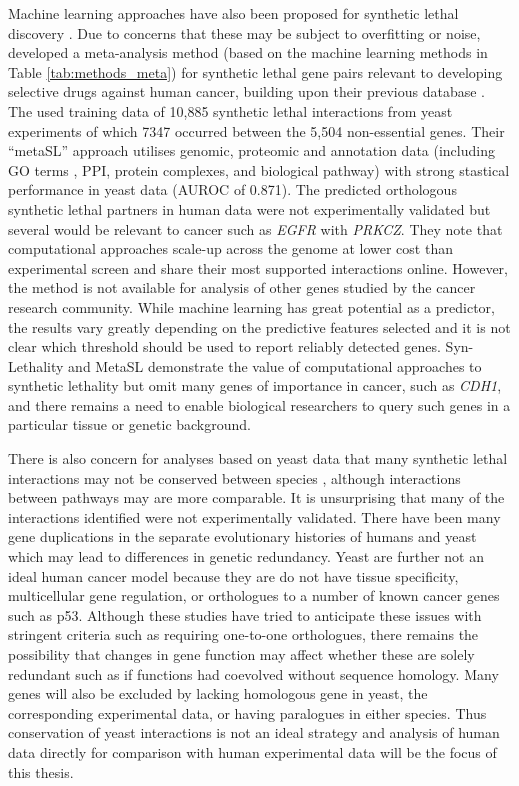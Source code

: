 Machine learning approaches have also been proposed for synthetic lethal discovery \citep{Babyak2004, Lee2009}. Due to concerns that these may be subject to overfitting or noise, \citet{Wu2014} developed a meta-analysis method (based on the machine learning methods in Table \ref{tab:methods_meta}) for synthetic lethal gene pairs relevant to developing selective drugs against human cancer, building upon their previous database \citep{Li2014}. The used training data of 10,885 synthetic lethal interactions from yeast experiments of which 7347 occurred between the 5,504 non-essential genes. Their ``metaSL'' approach utilises genomic, proteomic and annotation data (including GO terms \cite{Ashburner2000}, PPI, protein complexes, and biological pathway) with strong stastical performance in yeast data (AUROC of 0.871). The predicted orthologous synthetic lethal partners in human data were not experimentally validated but several would be relevant to cancer such as \textit{EGFR} with \textit{PRKCZ}. They note that computational approaches scale-up across the genome at lower cost than experimental screen and share their most supported interactions online. However, the method is not available for analysis of other genes studied by the cancer research community. While machine learning has great potential as a predictor, the results vary greatly depending on the predictive features selected and it is not clear which threshold should be used to report reliably detected genes. Syn-Lethality \citep{Li2014} and MetaSL \citep{Wu2014} demonstrate the value of computational approaches to synthetic lethality but omit many genes of importance in cancer, such as \textit{CDH1}, and there remains a need to enable biological researchers to query such genes in a particular tissue or genetic background. 

There is also concern for analyses based on yeast data that many synthetic lethal interactions may not be conserved between species \citet{Dixon2009a}, although interactions between pathways may are more comparable. It is unsurprising that many of the interactions identified were not experimentally validated. There have been many gene duplications in the separate evolutionary histories of humans and yeast which may lead to differences in genetic redundancy. Yeast are further not an ideal human cancer model because they are do not have tissue specificity, multicellular gene regulation, or orthologues to a number of known cancer genes such as p53. Although these studies have tried to anticipate these issues with stringent criteria such as requiring one-to-one orthologues, there remains the possibility that changes in gene function may affect whether these are solely redundant such as if functions had coevolved without sequence homology. Many genes will also be excluded by lacking homologous gene in yeast, the corresponding experimental data, or having paralogues in either species. Thus conservation of yeast interactions is not an ideal strategy and analysis of human data directly for comparison with human experimental data will be the focus of this thesis. 

